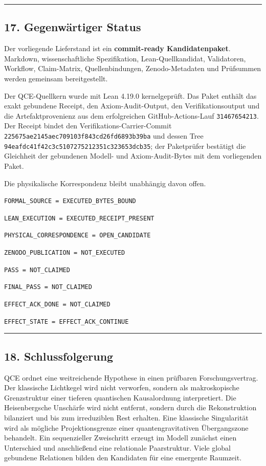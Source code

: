 \documentclass[
  11pt,
  a4paper,
]{article}
\begin{document}
\begin{center}\rule{0.5\linewidth}{0.5pt}\end{center}

\subsection{17. Gegenwärtiger Status}\label{gegenwuxe4rtiger-status}

Der vorliegende Lieferstand ist ein \textbf{commit-ready
Kandidatenpaket}. Markdown, wissenschaftliche Spezifikation,
Lean-Quellkandidat, Validatoren, Workflow, Claim-Matrix,
Quellenbindungen, Zenodo-Metadaten und Prüfsummen werden gemeinsam
bereitgestellt.

Der QCE-Quellkern wurde mit Lean 4.19.0 kernelgeprüft. Das Paket enthält
das exakt gebundene Receipt, den Axiom-Audit-Output, den
Verifikationsoutput und die Artefaktprovenienz aus dem erfolgreichen
GitHub-Actions-Lauf \texttt{31467654213}. Der Receipt bindet den
Verifikations-Carrier-Commit
\texttt{225675ae2145aec709103f843cd26fd6893b39ba} und dessen Tree
\texttt{94eafdc41f42c3c5107275212351c323653dcb35}; der Paketprüfer
bestätigt die Gleichheit der gebundenen Modell- und Axiom-Audit-Bytes
mit dem vorliegenden Paket.

Die physikalische Korrespondenz bleibt unabhängig davon offen.

\texttt{FORMAL\_SOURCE\ =\ EXECUTED\_BYTES\_BOUND}

\texttt{LEAN\_EXECUTION\ =\ EXECUTED\_RECEIPT\_PRESENT}

\texttt{PHYSICAL\_CORRESPONDENCE\ =\ OPEN\_CANDIDATE}

\texttt{ZENODO\_PUBLICATION\ =\ NOT\_EXECUTED}

\texttt{PASS\ =\ NOT\_CLAIMED}

\texttt{FINAL\_PASS\ =\ NOT\_CLAIMED}

\texttt{EFFECT\_ACK\_DONE\ =\ NOT\_CLAIMED}

\texttt{EFFECT\_STATE\ =\ EFFECT\_ACK\_CONTINUE}

\begin{center}\rule{0.5\linewidth}{0.5pt}\end{center}

\subsection{18. Schlussfolgerung}\label{schlussfolgerung}

QCE ordnet eine weitreichende Hypothese in einen prüfbaren
Forschungsvertrag. Der klassische Lichtkegel wird nicht verworfen,
sondern als makroskopische Grenzstruktur einer tieferen quantischen
Kausalordnung interpretiert. Die Heisenbergsche Unschärfe wird nicht
entfernt, sondern durch die Rekonstruktion bilanziert und bis zum
irreduziblen Rest erhalten. Eine klassische Singularität wird als
mögliche Projektionsgrenze einer quantengravitativen Übergangszone
behandelt. Ein sequenzieller Zweischritt erzeugt im Modell zunächst
einen Unterschied und anschließend eine relationale Paarstruktur. Viele
global gebundene Relationen bilden den Kandidaten für eine emergente
Raumzeit.
\end{document}
